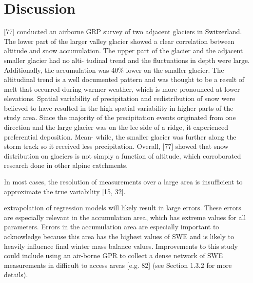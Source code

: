 \documentclass[twoside,twocolumn]{article}
\begin{document}

\pagebreak
\pagebreak
\section{Discussion}
[77] conducted an airborne GRP survey of two adjacent glaciers in Switzerland. The
lower part of the larger valley glacier showed a clear correlation between altitude and snow
accumulation. The upper part of the glacier and the adjacent smaller glacier had no alti-
tudinal trend and the fluctuations in depth were large. Additionally, the accumulation was
40\% lower on the smaller glacier. The altitudinal trend is a well documented pattern and
was thought to be a result of melt that occurred during warmer weather, which is more
pronounced at lower elevations. Spatial variability of precipitation and redistribution of
snow were believed to have resulted in the high spatial variability in higher parts of the
study area. Since the majority of the precipitation events originated from one direction and
the large glacier was on the lee side of a ridge, it experienced preferential deposition. Mean-
while, the smaller glacier was further along the storm track so it received less precipitation.
Overall, [77] showed that snow distribution on glaciers is not simply a function of altitude,
which corroborated research done in other alpine catchments.

 In most cases, the resolution of measurements over a large area is insufficient to
approximate the true variability [15, 32].


extrapolation of regression models will
likely result in large errors. These errors are especially relevant in the accumulation area,
which has extreme values for all parameters. Errors in the accumulation area are especially
important to acknowledge because this area has the highest values of SWE and is likely to
heavily influence final winter mass balance values. Improvements to this study could include
using an air-borne GPR to collect a dense network of SWE measurements in difficult to
access areas [e.g. 82] (see Section 1.3.2 for more details).




\end{document}
